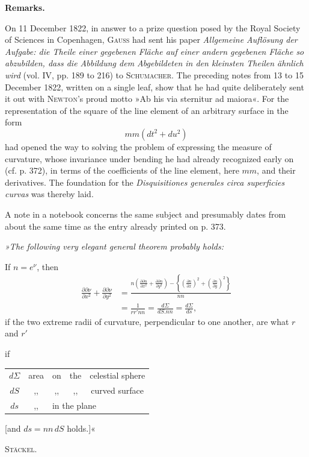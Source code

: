 %
\begin{center}\bfseries Remarks.\end{center}
\noindent\hspace*{1.2em} On 11 December 1822, in answer to a prize question posed by the Royal Society of Sciences in Copenhagen, \textsc{Gauss} had sent his paper \textit{Allgemeine Auflösung der Aufgabe: die Theile einer gegebenen Fläche auf einer andern gegebenen Fläche so abzubilden, dass die Abbildung dem Abgebildeten in den kleinsten Theilen ähnlich wird} (vol. IV, pp. 189 to 216) to \textsc{Schumacher}. The preceding notes from 13 to 15 December 1822, written on a single leaf, show that he had quite deliberately sent it out with \textsc{Newton}'s proud motto »Ab his via sternitur ad maiora«. For the representation of the square of the line element of an arbitrary surface in the form
\[
mm(dt^2+du^2)
\]
had opened the way to solving the problem of expressing the measure of curvature, whose invariance under bending he had already recognized early on (cf. p. 372), in terms of the coefficients of the line element, here $mm$, and their derivatives. The foundation for the \textit{Disquisitiones generales circa superficies curvas} was thereby laid.

A note in a notebook concerns the same subject and presumably dates from about the same time as the entry already printed on p. 373.

{\itshape »The following very elegant general theorem probably holds:

If $n=e^\nu$, then
\[
\begin{aligned}
\frac{\partial\partial\nu}{\partial x^2}+\frac{\partial\partial\nu}{\partial y^2}
&=\frac{n\left(\frac{\partial\partial n}{\partial x^2}+\frac{\partial\partial n}{\partial y^2}\right)-\left\{\left(\frac{\partial n}{\partial x}\right)^2+\left(\frac{\partial n}{\partial y}\right)^2\right\}}{nn}\\
&=\frac1{rr'nn}=\frac{d\Sigma}{dS.nn}=\frac{d\Sigma}{ds},
\end{aligned}
\]
if the two extreme radii of curvature, perpendicular to one another, are what $r$ and $r'$

 if
\begin{center}
\begin{tabular}{ccccc}
$d\Sigma$&area&on&the&celestial sphere\\
$dS$&,,&,,&,,&curved surface\\
$ds$&,,&\multicolumn{3}{l}{in the plane}
\end{tabular}
\end{center}
[and $ds=nn\,dS$ holds.]«\par}
\begin{flushright}\textsc{Stäckel.}\end{flushright}

